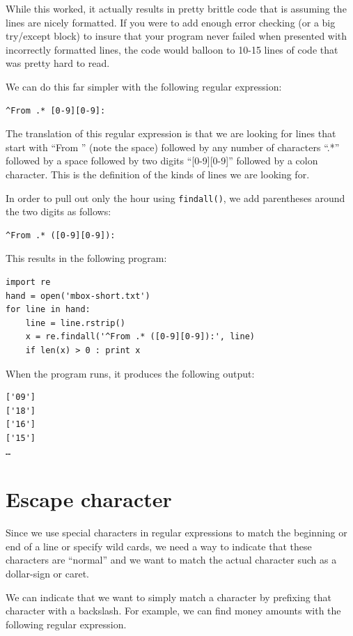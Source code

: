 \documentclass[10pt]{book}
\begin{document}
While this worked, it actually results in pretty brittle code that is assuming the lines are nicely formatted.  If you were to add enough error checking (or a big try/except block) to insure that your program never failed when presented with incorrectly formatted lines, the code would balloon to 10-15 lines of code that was pretty hard to read.

We can do this far simpler with the following regular expression:

\beforeverb
\begin{verbatim}
^From .* [0-9][0-9]:
\end{verbatim}
\afterverb
%
The translation of this regular expression is that we are looking for lines that start with ``From '' (note the space) followed by any number of characters ``.*'' followed by a space followed by two digits ``[0-9][0-9]'' followed by a colon character.  This is the definition of the kinds of lines we are looking for.  

In order to pull out only the hour using {\tt findall()}, we add parentheses around the two digits as follows:

\beforeverb
\begin{verbatim}
^From .* ([0-9][0-9]):
\end{verbatim}
\afterverb
%
This results in the following program:

\beforeverb
\begin{verbatim}
import re
hand = open('mbox-short.txt')
for line in hand:
    line = line.rstrip()
    x = re.findall('^From .* ([0-9][0-9]):', line)
    if len(x) > 0 : print x
\end{verbatim}
\afterverb
%
When the program runs, it produces the following output:

\beforeverb
\begin{verbatim}
['09']
['18']
['16']
['15']
…
\end{verbatim}
\afterverb
%
\section{Escape character}

Since we use special characters in regular expressions to match the beginning or end of 
a line or specify wild cards, we need a way to indicate that these characters are ``normal'' 
and we want to match the actual character such as a dollar-sign or caret.

We can indicate that we want to simply match a character by prefixing that character 
with a backslash.  For example, we can find money amounts with the following regular
expression.
\end{document}
